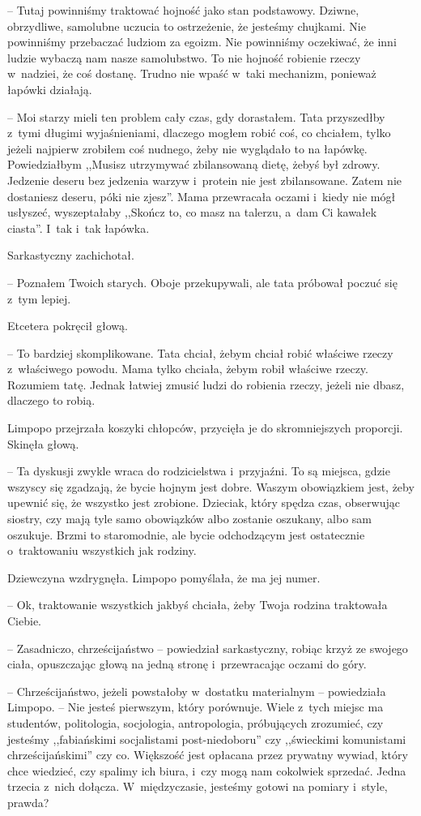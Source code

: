 \documentclass[oneside,polish,11pt,sfheadings]{mwbk}
\begin{document}
-- Tutaj powinniśmy traktować hojność jako stan podstawowy. Dziwne,
obrzydliwe, samolubne uczucia to ostrzeżenie, że jesteśmy chujkami. Nie
powinniśmy przebaczać ludziom za egoizm. Nie powinniśmy oczekiwać, że
inni ludzie wybaczą nam nasze samolubstwo. To nie hojność robienie
rzeczy w~nadziei, że coś dostanę. Trudno nie wpaść w~taki mechanizm,
ponieważ łapówki działają.

-- Moi starzy mieli ten problem cały czas, gdy dorastałem. Tata
przyszedłby z~tymi długimi wyjaśnieniami, dlaczego mogłem robić coś, co
chciałem, tylko jeżeli najpierw zrobiłem coś nudnego, żeby nie wyglądało
to na łapówkę. Powiedziałbym ,,Musisz utrzymywać zbilansowaną dietę,
żebyś był zdrowy. Jedzenie deseru bez jedzenia warzyw i~protein nie jest
zbilansowane. Zatem nie dostaniesz deseru, póki nie zjesz''. Mama
przewracała oczami i~kiedy nie mógł usłyszeć, wyszeptałaby ,,Skończ to,
co masz na talerzu, a~dam Ci kawałek ciasta''. I~tak i~tak łapówka.

Sarkastyczny zachichotał. 

-- Poznałem Twoich starych. Oboje przekupywali,
ale tata próbował poczuć się z~tym lepiej.

Etcetera pokręcił głową. 

-- To bardziej skomplikowane. Tata chciał, żebym
chciał robić właściwe rzeczy z~właściwego powodu. Mama tylko chciała,
żebym robił właściwe rzeczy. Rozumiem tatę. Jednak łatwiej zmusić ludzi
do robienia rzeczy, jeżeli nie dbasz, dlaczego to robią.

Limpopo przejrzała koszyki chłopców, przycięła je do skromniejszych
proporcji. Skinęła głową. 

-- Ta dyskusji zwykle wraca do rodzicielstwa i~przyjaźni. To są miejsca, gdzie wszyscy się zgadzają, że bycie hojnym
jest dobre. Waszym obowiązkiem jest, żeby upewnić się, że wszystko jest
zrobione. Dzieciak, który spędza czas, obserwując siostry, czy mają tyle
samo obowiązków albo zostanie oszukany, albo sam oszukuje. Brzmi to
staromodnie, ale bycie odchodzącym jest ostatecznie o~traktowaniu
wszystkich jak rodziny.

Dziewczyna wzdrygnęła. Limpopo pomyślała, że ma jej numer. 

-- Ok,
traktowanie wszystkich jakbyś chciała, żeby Twoja rodzina traktowała
Ciebie.

-- Zasadniczo, chrześcijaństwo -- powiedział sarkastyczny, robiąc krzyż ze
swojego ciała, opuszczając głową na jedną stronę i~przewracając oczami
do góry.

-- Chrześcijaństwo, jeżeli powstałoby w~dostatku materialnym -- powiedziała Limpopo. -- Nie jesteś pierwszym, który porównuje. Wiele z~tych miejsc ma studentów, politologia, socjologia, antropologia,
próbujących zrozumieć, czy jesteśmy ,,fabiańskimi socjalistami
post-niedoboru'' czy ,,świeckimi komunistami chrześcijańskimi'' czy co.
Większość jest opłacana przez prywatny wywiad, który chce wiedzieć, czy
spalimy ich biura, i~czy mogą nam cokolwiek sprzedać. Jedna trzecia z~nich dołącza. W~międzyczasie, jesteśmy gotowi na pomiary i~style,
prawda?
\end{document}

